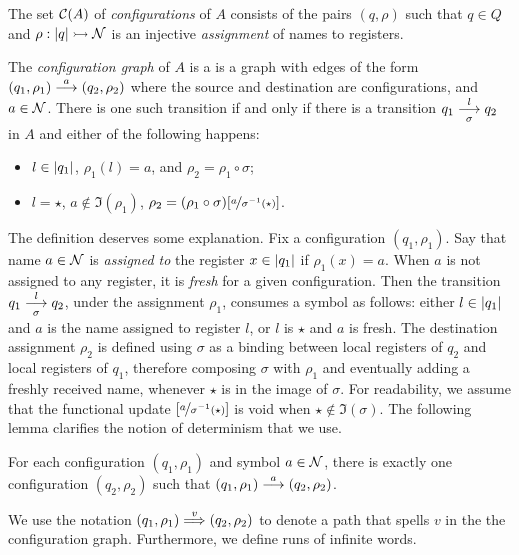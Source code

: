 \begin{definition}
 The set $\mathcal{C}(A)$ of \emph{configurations} of $A$ consists of the pairs $(q,\rho)$ such that $q \in Q$ and $\rho : |q| \rightarrowtail \mathcal{N}$ is an injective \emph{assignment} of names to registers.
\end{definition}

\begin{definition}
\label{def:config-graph}
The \emph{configuration graph} of $A$ is a is a graph with edges of the form  
$(q_1,\rho_1) \overset{a}{\longrightarrow} (q_2,\rho_2)$ where the source and destination are configurations, and $a \in \mathcal{N}$. There is one such transition if and only if there is a transition $q_1 \overset{l}{\underset{\sigma}{\longrightarrow}} q_2$ in $A$ and either of the following happens: 
 \begin{itemize} 
  \item $l \in |q_1|$, $\rho_1(l) = a$, and $\rho_2 = \rho_1 \circ \sigma$;
  \item $l = \star$, $a \notin \Im(\rho_1)$, $\rho_2 = (\rho_1 \circ \sigma)[\nicefrac{a}{\sigma^{-1}(\star)}]$.
 \end{itemize}
\end{definition}
% 

The definition deserves some explanation. Fix a configuration $(q_1,\rho_1)$. Say that name $a\in \mathcal{N}$ is \emph{assigned to} the register $x \in |q_1|$ if $\rho_1(x) = a$. When $a$ is not assigned to any register, it is \emph{fresh} for a given configuration. Then the transition $q_1 \overset{l}{\underset{\sigma}{\longrightarrow}} q_2$, under the assignment $\rho_1$, consumes a symbol as follows: either $l \in |q_1|$ and $a$ is the name assigned to register $l$, or $l$ is $\star$ and $a$ is fresh. The destination assignment $\rho_2$ is defined using $\sigma$ as a binding between local registers of $q_2$ and local registers of $q_1$, therefore composing $\sigma$ with $\rho_1$ and eventually adding a freshly received name, whenever $\star$ is in the image of $\sigma$. For readability, we assume that the functional update $[\nicefrac{a}{\sigma^{-1}(\star)}]$ is void when $\star \notin \Im(\sigma)$. The following lemma clarifies the notion of determinism that we use.

\begin{lemma}
\label{lem:deterministic-configuration-graph}
 For each configuration $(q_1,\rho_1)$ and symbol $a \in \mathcal{N}$, there is exactly one configuration $(q_2,\rho_2)$ such that $(q_1,\rho_1) \overset{a}{\longrightarrow} (q_2,\rho_2)$.
\end{lemma}
%
We use the notation $(q_1,\rho_1) \overset{v}{\Longrightarrow} (q_2,\rho_2)$ to denote a path that spells $v$ in the the configuration graph. Furthermore, we define runs of infinite words.
%

